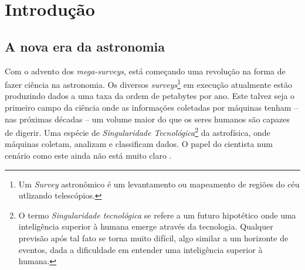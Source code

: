 


\chapter{Introdução}
\label{sec:Intro}


\section{A nova era da astronomia}

Com o advento dos {\em mega-surveys}, está começando uma revolução na forma de
fazer ciência na astronomia. Os diversos {\em surveys}\footnote{Um {\em Survey}
astronômico é um levantamento ou mapeamento de regiões do céu utlizando
telescópios.} em execução atualmente estão produzindo dados a uma taxa da ordem
de petabytes por ano. Este talvez seja o primeiro campo da ciência onde as
informações coletadas por máquinas tenham -- nas próximas décadas -- um volume
maior do que os seres humanos são capazes de digerir. Uma espécie de {\em
Singularidade Tecnológica}\footnote{O termo {\em Singularidade tecnológica} se
refere a um futuro hipotético onde uma inteligência superior à humana emerge
através da tecnologia. Qualquer previsão após tal fato se torna muito difícil,
algo similar a um horizonte de eventos, dada a dificuldade em entender uma
inteligência superior à humana.} da astrofísica, onde máquinas coletam, analizam
e classificam dados. O papel do cientista num cenário como este ainda não está
muito claro \citep{Norris2010}.

